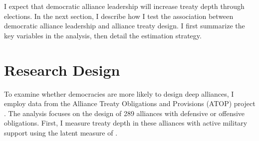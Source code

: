 \documentclass[12pt]{article}
\begin{document}
I expect that democratic alliance leadership will increase treaty depth through elections. 
In the next section, I describe how I test the association between democratic alliance leadership and alliance treaty design. 
I first summarize the key variables in the analysis, then detail the estimation strategy.



\section{Research Design}



To examine whether democracies are more likely to design deep alliances, I employ data from the Alliance Treaty Obligations and Provisions (ATOP) project \citep{Leedsetal2002}. 
The analysis focuses on the design of 289 alliances with defensive or offensive obligations.
First, I measure treaty depth in these alliances with active military support using the latent measure of \citet{Alley2021isq}.
\end{document}
